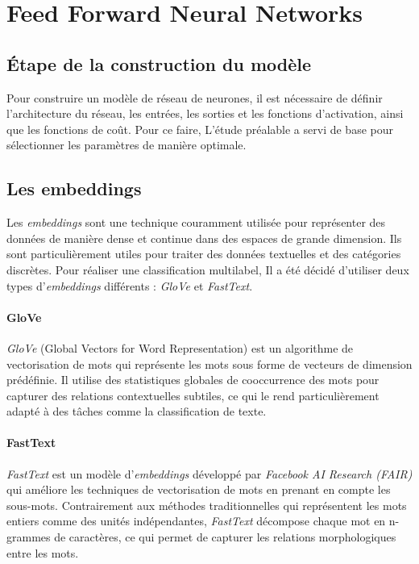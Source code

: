 \chapter{Feed Forward Neural Networks}

\section{Étape de la construction du modèle}

Pour construire un modèle de réseau de neurones, il est nécessaire de définir l'architecture du réseau, les entrées, les sorties et les fonctions d'activation, ainsi que les fonctions de coût. 
Pour ce faire, L'étude préalable a servi de base pour sélectionner les paramètres de manière optimale.

\section{Les embeddings}

Les \textit{embeddings} sont une technique couramment utilisée pour représenter des données de manière dense et continue dans des espaces de grande dimension. 
Ils sont particulièrement utiles pour traiter des données textuelles et des catégories discrètes.
Pour réaliser une classification multilabel, Il a été décidé d'utiliser deux types d'\textit{embeddings} différents : \textit{GloVe} et \textit{FastText}.

\subsubsection{GloVe}

\textit{GloVe} (Global Vectors for Word Representation) est un algorithme de vectorisation de mots qui représente les mots sous forme de vecteurs de dimension prédéfinie. 
Il utilise des statistiques globales de cooccurrence des mots pour capturer des relations contextuelles subtiles, ce qui le rend particulièrement adapté à des tâches comme la classification de texte.

\subsubsection{FastText}

\textit{FastText} est un modèle d'\textit{embeddings} développé par \textit{Facebook AI Research (FAIR)} qui améliore les techniques de vectorisation de mots en prenant en compte les sous-mots. 
Contrairement aux méthodes traditionnelles qui représentent les mots entiers comme des unités indépendantes, \textit{FastText} décompose chaque mot en n-grammes de caractères, ce qui permet de capturer les relations morphologiques entre les mots.


